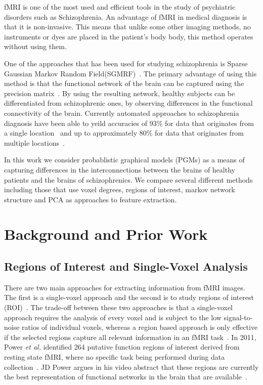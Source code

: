 \documentclass{article} %
\begin{document}
fMRI is one of the most used and efficient tools in the study of 
psychiatric disorders such as Schizophrenia\cite{}. An advantage of fMRI in
medical diagnosis is that it is non-invasive. This means that unlike some 
other imaging methods, no instruments or dyes are placed in the patient’s body
body, this method operates without using them\cite{}. 

One of the approaches that has been used for studying schizophrenia is 
Sparse Gaussian Markov Random Field(SGMRF)~\cite{Rish_2013}\cite{Rosa_2013}. 
The primary advantage of using this method is that the functional network of 
the brain can be captured using the precision matrix~\cite{Rish_2013}.
By using the resulting network, healthy subjects can be differentiated from 
schizophrenic ones, by observing differences in the functional connectivity 
of the brain. Currently automated approaches to schizophrenia
diagnosis have been able to yeild accuracies of $93\%$ for data that 
originates from a single location~\cite{Rish_2013} and up to approximately 
$80\%$ for data that originates from multiple locations~\cite{Cheng2015}.

In this work we consider probablistic graphical models (PGMs) as a means
of capturing differences in the interconnections between the brains of
healthy patients and the brains of schizophrenics. We compare several 
different methods including those that use voxel degrees, regions of 
interest, markov network structure and PCA as approaches to feature
extraction.

\section{Background and Prior Work}

\subsection{Regions of Interest and Single-Voxel Analysis}
There are two main approaches for extracting
information from fMRI images. The first is a single-voxel approach and 
the second is to study regions of interest (ROI)~\cite{heller2006cluster}. 
The trade-off between these two approaches is that a single-voxel approach
requires the analysis of every voxel and is subject to the low signal-to-noise 
ratios of individual voxels, whereas a region based approach is only
effective if the selected regions capture all relevant information in an fMRI 
task~\cite{heller2006cluster}. In 2011, Power \emph{et al.} identified 264 
putative function regions of interest derived from resting state fMRI, where 
no specific task being performed during data collection~\cite{Power_2011}. 
JD Power argues in his video abstract that these regions are currently the
best representation of functional networks in the brain that are
available~\cite{Power_2011}.
\end{document}
